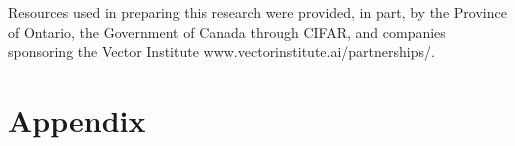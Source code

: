 \documentclass{article}
\newcommand{\appendixtoc}{%
    \startcontents[appendix]
    \printcontents[appendix]{l}{1}{\setcounter{tocdepth}{2}}
}
\theoremstyle{plain}
\theoremstyle{definition}
\theoremstyle{remark}
\begin{document}
\newpage
\begin{ack}
Resources used in preparing this research were provided, in part, by the Province of Ontario, the Government of Canada through CIFAR, and companies sponsoring the Vector Institute www.vectorinstitute.ai/partnerships/.
\end{ack}
















\newpage
\appendix

\renewcommand{\thesection}{A\arabic{section}}
\section*{Appendix}
\appendixtoc

\newpage
\end{document}
